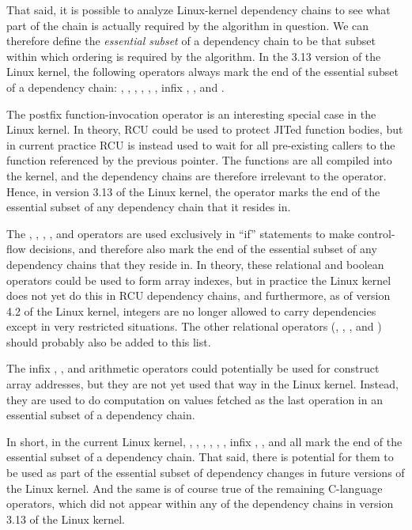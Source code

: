 \documentclass[letterpaper,twocolumn,10pt]{article}
\begin{document}
That said, it is possible to analyze Linux-kernel dependency chains
to see what part of the chain is actually required by the algorithm
in question.
We can therefore define the \emph{essential subset} of a dependency chain
to be that subset within which ordering is required by the algorithm.
In the 3.13 version of the Linux kernel, the following operators
always mark the end of the essential subset of a dependency chain:
\co{()}, \co{!}, \co{==}, \co{!=}, \co{&&}, \co{||}, infix \co{*}, \co{/},
and \co{\%}.

The postfix \co{()} function-invocation operator is an interesting special
case in the Linux kernel.
In theory, RCU could be used to protect JITed function bodies, but in
current practice RCU is instead used to wait for all pre-existing
callers to the function referenced by the previous pointer.
The functions are all compiled into the kernel, and the dependency
chains are therefore irrelevant to the \co{()} operator.
Hence, in version 3.13 of the Linux kernel, the \co{()} operator
marks the end of the essential subset of any dependency chain that
it resides in.

The \co{!}, \co{==}, \co{!=}, \co{&&}, and \co{||} operators are
used exclusively in ``if'' statements to make control-flow decisions,
and therefore also mark the end of the essential subset of any
dependency chains that they reside in.
In theory, these relational and boolean operators could be used to
form array indexes, but in practice the Linux kernel does not yet
do this in RCU dependency chains, and furthermore, as of version 4.2
of the Linux kernel, integers are no longer allowed to carry dependencies
except in very restricted situations.
The other relational operators (\co{>}, \co{<}, \co{>=}, and \co{<=})
should probably also be added to this list.

The infix \co{*}, \co{/}, and \co{\%} arithmetic operators could potentially
be used for construct array addresses, but they are not yet used that
way in the Linux kernel.
Instead, they are used to do computation on values fetched as the
last operation in an essential subset of a dependency chain.

In short, in the current Linux kernel,
\co{()}, \co{!}, \co{==}, \co{!=}, \co{&&}, \co{||}, infix \co{*}, \co{/},
and \co{\%} all mark the end of the essential subset of a dependency
chain.
That said, there is potential for them to be used as part of the
essential subset of dependency changes in future versions of the
Linux kernel.
And the same is of course true of the remaining C-language operators,
which did not appear within any of the dependency chains in version 3.13
of the Linux kernel.
\end{document}
